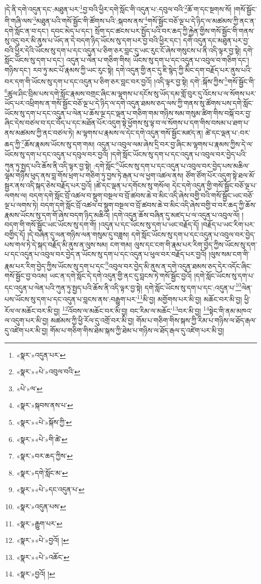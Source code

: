 །དེ་ནི་དགེ་འདུན་དང་:མཐུན་པར་\footnote{«སྣར་»འདུན་པར་}བྱ་བའི་ཕྱིར་དགེ་སློང་གི་འདུན་པ་:དབུལ་བའི་\footnote{«སྣར་»«པེ་»འབུལ་བའི་}ཆོ་ག་དང་སྔགས་སོ། །གསོ་སྦྱོང་གི་གཞི་ལས་\footnote{«པེ་»ལ་}མཐུན་པའི་གསོ་སྦྱོང་གི་ཚོགས་པའི་:སྐབས་ནས་\footnote{«སྣར་»སྐབས་ནས་པ་}གསོ་སྦྱོང་བཅོ་ལྔ་པ་དེ་ཉིད་ལ་མཚམས་ཀྱི་ནང་ན་དགེ་སློང་ན་བ་དང་། དབང་མེད་པ་དང་། སྲོག་དང་ཚངས་པར་སྤྱོད་པའི་བར་ཆད་ཀྱི་རྐྱེན་གྱིས་གསོ་སྦྱོང་གི་གནས་སུ་འདུ་བར་མི་ནུས་པ་ཡོད་ན་དེ་བདག་ཉིད་ཡོངས་སུ་དག་པར་བྱ་བའི་ཕྱིར་དང་། དགེ་འདུན་དང་མཐུན་པར་བྱ་བའི་ཕྱིར་དེའི་ཡོངས་སུ་དག་པ་དང་འདུན་པ་ཅིག་ཅར་བླང་དུ་ཡང་རུང་ངོ་ཞེས་གསུངས་པ་ནི་འདི་ལྟར་བྱ་སྟེ། དགེ་སློང་ཡོངས་སུ་དག་པ་དང་། འདུན་པ་ལེན་པ་གཅིག་གིས། ཡོངས་སུ་དག་པ་དང་འདུན་པ་འབུལ་བ་གཅིག་དང་། གཉིས་དང་། རབ་ཏུ་མང་པོ་རྣམས་ཀྱི་ཡང་རུང་སྟེ། དགེ་འདུན་གྱི་ནང་དུ་ཇི་སྙེད་ཀྱི་མིང་དག་བརྗོད་པར་ནུས་པའི་བར་དག་གི་ཡོངས་སུ་དག་པ་དང་འདུན་པ་ཅིག་ཅར་བླང་བར་བྱའོ། །འདི་ལྟར་བྱ་སྟེ། དགེ་:སྐོས་ཀྱིས་\footnote{«སྣར་»«པེ་»སྐོས་ཀྱི་}གསོ་སྦྱོང་གི་\footnote{«སྣར་»«པེ་»གི་ཚེ་}ཚུལ་ཤིང་བྲིམ་པས་དགེ་སློང་རྣམས་བགྲང་ཞིང་མ་ལྷགས་པ་དངོས་སུ་ཡོད་དམ་གློ་བུར་དུ་འོངས་པ་ལ་སོགས་པར་ཡོད་པར་འཕྲིགས་ན་གསོ་སྦྱོང་བཅོ་ལྔ་པ་དེ་ཉིད་ལ་དགེ་འདུན་ཐམས་ཅད་ལས་ཀྱི་གནས་སུ་ཚོགས་པས་དགེ་སློང་ཡོངས་སུ་དག་པ་དང་འདུན་པ་ལེན་པ་ཆོས་ལྔ་དང་ལྡན་པ་གཅིག་གམ་གཉིས་སམ་གསུམ་ཚིག་གིས་བསྐོ་བར་བྱ་ཞིང་དེས་བཙལ་བ་དང་བོད་པ་དང་མཐོན་པོར་འདུག་སྟེ་ཕྱོགས་སུ་ལྟ་བ་ལ་སོགས་པ་དག་གིས་བསམ་པ་ཐག་པ་ནས་མཚམས་ཀྱི་ནང་བཙལ་ཏེ། མ་ལྷགས་པ་རྣམས་ལ་དེང་དགེ་འདུན་གསོ་སྦྱོང་མཛད་ན། ཚེ་དང་ལྡན་པ་:བར་ཆད་ཀྱི་\footnote{«སྣར་»བར་ཆད་ཀྱིས་}ཆོས་རྣམས་ཡོངས་སུ་དག་གམ། འདུན་པ་འབུལ་ལམ་ཞེས་དྲི་བར་བྱ་ཞིང་མ་ལྷགས་པ་རྣམས་ཀྱིས་དེ་ལ་ཡོངས་སུ་དག་པ་དང་འདུན་པ་དབུལ་བར་བྱའོ། །དགེ་སློང་ཡོངས་སུ་དག་པ་དང་འདུན་པ་འབུལ་བར་བྱེད་པའི་ཀུན་ཏུ་སྤྱད་པའི་ཆོས་ནི་འདི་ལྟར་བྱ་སྟེ། :དགེ་སློང་\footnote{«སྣར་»དགེ་སློང་མ་}ཡོངས་སུ་དག་པ་དང་འདུན་པ་འབུལ་བར་བྱེད་པས་མཆིལ་ལྷམ་གཉིས་ཕུད་ནས་བླ་གོས་ཕྲག་པ་གཅིག་ཏུ་བྱས་ཏེ་རྒན་པ་ལ་ཕྱག་འཚལ་ནས། ཙོག་ཙོག་པོར་འདུག་སྟེ་ཐལ་མོ་སྦྱར་ནས་འདི་སྐད་ཅེས་བརྗོད་པར་བྱའོ། །ཚེ་དང་ལྡན་པ་དགོངས་སུ་གསོལ། དེང་དགེ་འདུན་གྱི་གསོ་སྦྱོང་བཅོ་ལྔ་པ་ལགས་ལ། བདག་དགེ་སློང་བྲོ་འཚལ་བ་སྡུག་བསྔལ་བ་བྲོ་ཚབས་ཆེ་བ་མིང་འདི་ཞེས་བགྱི་བའི་གསོ་སྦྱོང་ཡང་བཅོ་ལྔ་པ་ལགས་ཏེ། བདག་དགེ་སློང་བྲོ་འཚལ་བ་སྡུག་བསྔལ་བ་བྲོ་ཚབས་ཆེ་བ་མིང་འདི་ཞེས་བགྱི་བ་བར་ཆད་ཀྱི་ཆོས་རྣམས་ཡོངས་སུ་དག་གོ་ཞེས་བདག་ཉིད་མཆིའོ། །དགེ་འདུན་ཆོས་བཞིན་དུ་མཛད་པ་ལ་འདུན་པ་འབུལ་ལོ། །བདག་གི་གསོ་སྦྱོང་ཡང་ཡོངས་སུ་དག་གོ། །འདུན་པ་དང་ཡོངས་སུ་དག་པ་ཡང་བརྗོད་དོ། །བརྗོད་པ་ཡང་རིག་པར་བགྱིད་དོ། །དེ་བཞིན་དུ་ལན་གཉིས་ལན་གསུམ་དུ་བཟླས། དགེ་སློང་ཡོངས་སུ་དག་པ་དང་འདུན་པ་འབུལ་བར་བྱེད་པས་གལ་ཏེ་དེ་སྐད་བརྗོད་མི་ནུས་ན་ལུས་སམ། ངག་གམ། ལུས་དང་ངག་གི་རྣམ་པར་རིག་བྱེད་ཀྱིས་ཡོངས་སུ་དག་པ་དང་འདུན་པ་འབུལ་བར་བྱེད་ན་ཡོངས་སུ་དག་པ་དང་འདུན་པ་ཕུལ་བར་བརྗོད་པར་བྱའོ། །ལུས་སམ་ངག་གི་རྣམ་པར་རིག་བྱེད་ཀྱིས་ཡོངས་སུ་དག་པ་དང་\footnote{«སྣར་»«པེ་»དང་འདུན་པ་}འབུལ་བར་བྱེད་མི་ནུས་ན་དགེ་འདུན་ཐམས་ཅད་དེར་འདོང་ཞིང་གསོ་སྦྱོང་བྱ་བའམ། ཡང་ན་དགེ་སློང་དེ་དགེ་འདུན་གྱི་ནང་དུ་བླངས་ཏེ་གསོ་སྦྱོང་བྱའོ། །དགེ་སློང་ཡོངས་སུ་དག་པ་དང་འདུན་པ་ལེན་པའི་ཀུན་ཏུ་སྤྱད་པའི་ཆོས་ནི་འདི་ལྟར་བྱ་སྟེ། དགེ་སློང་ཡོངས་སུ་དག་པ་དང་:འདུན་པ་\footnote{«སྣར་»འདུན་པས་}ལེན་པས་ཡོངས་སུ་དག་པ་དང་འདུན་པ་བླངས་ནས་:བརྒྱུག་པར་\footnote{«སྣར་»རྒྱུག་པར་}མི་བྱ། མགྱོགས་པར་མི་བྱ། མཆོང་བར་མི་བྱ། ཕྱི་རོལ་ལ་མཆོང་བར་མི་བྱ། \footnote{«སྣར་»«པེ་»བྱའོ། ། }འོབས་ལ་མཆོང་བར་མི་བྱ། བང་རིམ་ལ་མཆོང་\footnote{«སྣར་»«པེ་»འཆོང་}བར་མི་བྱ། \footnote{«སྣར་»བྱའོ། ། }སྟེང་གི་ནམ་མཁའ་ལ་འདུག་པར་མི་བྱ། མཚམས་ཀྱི་ཕྱི་རོལ་དུ་འགྲོ་བར་མི་བྱ། གོམ་པ་གཅིག་གིས་སྐས་ཀྱི་རིམ་པ་གཉིས་ལ་ཐོད་རྒལ་དུ་འཛེག་པར་མི་བྱ། གོམ་པ་གཅིག་གིས་ཐེམ་སྐས་ཀྱི་ཐེམ་པ་གཉིས་ལ་ཐོད་རྒལ་དུ་འཛེག་པར་མི་བྱ། 